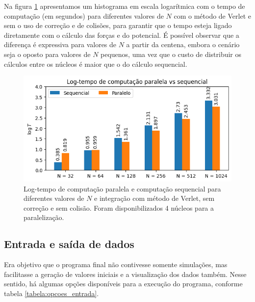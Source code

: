 

Na figura \ref{fig:logtempo_paralelo_vs_sequencial} apresentamos um histograma em escala logarítmica com o tempo de computação (em segundos) para diferentes valores de $N$ com o método de Verlet e sem o uso de correção e de colisões, para garantir que o tempo esteja ligado diretamente com o cálculo das forças e do potencial. É possível observar que a diferença é expressiva para valores de $N$ a partir da centena, embora o cenário seja o oposto para valores de $N$ pequenos, uma vez que o custo de distribuir os cálculos entre os núcleos é maior que o do cálculo sequencial.

\begin{figure}
    \centering
    \includegraphics[width=0.8\linewidth]{tcc//img/logtempo.png}
    \caption{Log-tempo de computação paralela e computação sequencial para diferentes valores de $N$ e integração com método de Verlet, sem correção e sem colisão. Foram disponibilizados 4 núcleos para a paralelização.}
    \label{fig:logtempo_paralelo_vs_sequencial}
\end{figure}


\subsection{Entrada e saída de dados}
Era objetivo que o programa final não contivesse somente simulações, mas facilitasse a geração de valores iniciais e a visualização dos dados também. Nesse sentido, há algumas opções disponíveis para a execução do programa, conforme tabela \ref{tabela:opcoes_entrada}.

